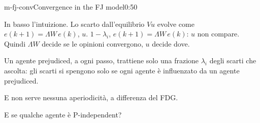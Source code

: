 \begin{slide}{m-fj-conv}{Convergence in the FJ model}{0:50 {\color{red}}}
\begin{discorso}
    \item {\color{red} } {\color{blue}In basso l'intuizione. Lo} scarto dall'equilibrio {\color{blue}$Vu$} evolve come {\color{red}$e(k+1)=\Lambda W\,e(k)$,} {\color{red}} {\color{red}$u$.} {\color{red}         } {\color{red}$1-\lambda_i$,} {\color{red}     } {\color{blue}$e(k+1)=\Lambda W\,e(k)$: $u$ non compare. Quindi $\Lambda W$ decide} se {\color{red}       } {\color{blue}le opinioni convergono, $u$ decide dove.}
    \item {\color{blue}Un agente prejudiced, a ogni passo, trattiene solo una frazione $\lambda_i$ degli scarti che ascolta: gli scarti si spengono solo se ogni agente è influenzato da un agente prejudiced.}
    \item {\color{blue}E non serve nessuna aperiodicità, a differenza del FDG.}
    \item {\color{blue}E se qualche agente è P-independent?}
    \item {\color{red}     }
  \end{discorso}
\end{slide}

